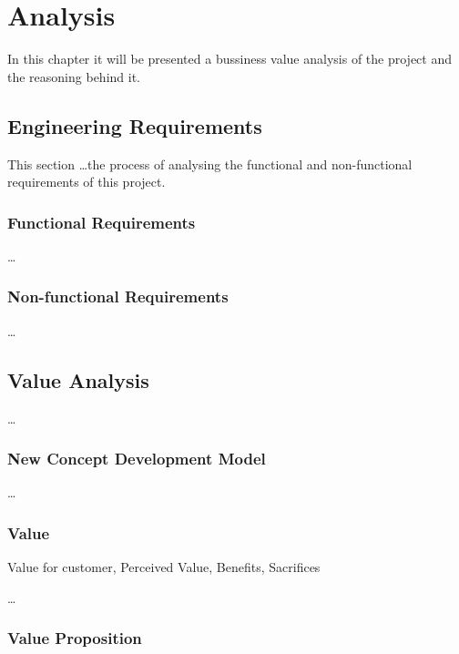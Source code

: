 
\chapter{Analysis} %
\label{chap:Chapter3} %

In this chapter it will be presented a bussiness value analysis of the project and the reasoning behind it. 

\section{Engineering Requirements}

This section \dots the process of analysing the functional and non-functional requirements of this project.

\subsection{Functional Requirements}

\dots

\subsection{Non-functional Requirements}

\dots

\section{Value Analysis}

\dots

\subsection{New Concept Development Model}

\dots

\subsection{Value}

Value for customer, Perceived Value, Benefits, Sacrifices

\dots

\subsection{Value Proposition}

